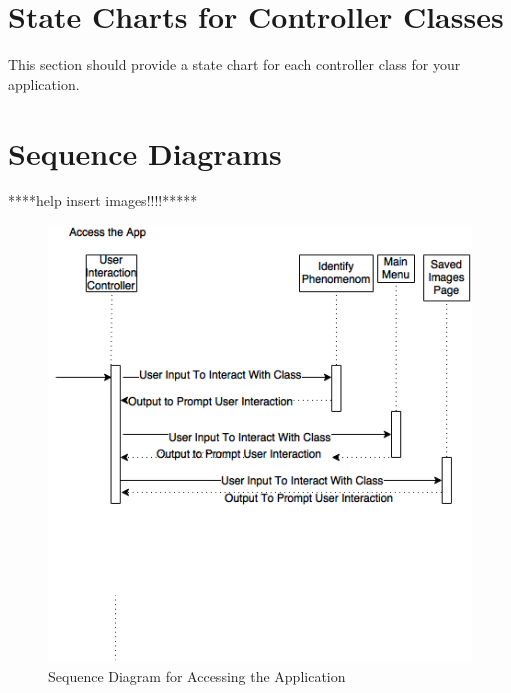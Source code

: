 \documentclass[]{article}
\begin{document}

\section{State Charts for Controller Classes}
\label{sec:state_charts_for_controller_classes}
This section should provide a state chart for each controller class for your application.
 
\section{Sequence Diagrams}
\label{sec:sequence_diagrams}
****help insert images!!!!*****
\begin{figure}[!hb]
	\includegraphics[width=\linewidth]{sequenceDiagram1.png}
	\caption{Sequence Diagram for Accessing the Application}
\end{figure}
\end{document}
